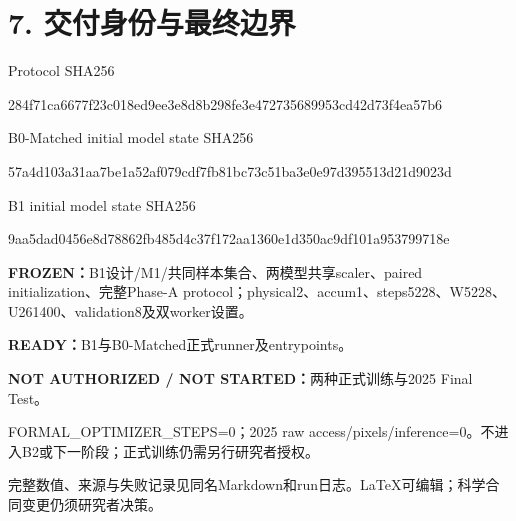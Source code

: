 \documentclass[10pt,a4paper,fontset=windows]{ctexart}
\begin{document}
\section*{7. 交付身份与最终边界}
\par\noindent Protocol SHA256\par{\small\ttfamily 284f71ca6677f23c018ed9ee3e8d8b298fe3e472735689953cd42d73f4ea57b6}\par
\par\noindent B0-Matched initial model state SHA256\par{\small\ttfamily 57a4d103a31aa7be1a52af079cdf7fb81bc73c51ba3e0e97d395513d21d9023d}\par
\par\noindent B1 initial model state SHA256\par{\small\ttfamily 9aa5dad0456e8d78862fb485d4c37f172aa1360e1d350ac9df101a953799718e}\par
\textbf{FROZEN：}B1设计/M1/共同样本集合、两模型共享scaler、paired initialization、完整Phase-A protocol；physical2、accum1、steps5228、W5228、U261400、validation8及双worker设置。

\textbf{READY：}B1与B0-Matched正式runner及entrypoints。

\textbf{NOT AUTHORIZED / NOT STARTED：}两种正式训练与2025 Final Test。\par FORMAL\_OPTIMIZER\_STEPS=0；2025 raw access/pixels/inference=0。不进入B2或下一阶段；正式训练仍需另行研究者授权。

完整数值、来源与失败记录见同名Markdown和run日志。LaTeX可编辑；科学合同变更仍须研究者决策。
\endgroup
\end{document}
